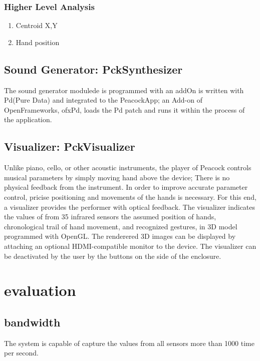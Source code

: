 \documentclass{nime-alternate}
\begin{document}
\subsubsection{Higher Level Analysis}

\begin{enumerate}
       \item Centroid X,Y
       \item Hand position
\end{enumerate}

\subsection{Sound Generator: PckSynthesizer}

The sound generator modulede is programmed with an addOn 
 is written with Pd(Pure Data) and integrated to the PeacockApp; an Add-on of OpenFrameworks, ofxPd, loads the Pd patch and runs it within the process of the application.

\subsection{Visualizer: PckVisualizer}

Unlike piano, cello, or other acoustic instruments, the player of Peacock controls musical parameters by simply moving hand above the device; There is no physical feedback from the instrument. In order to improve accurate parameter control, pricise positioning and movements of the hands is necessary. For this end, a visualizer provides the performer with optical feedback.  The visualizer indicates the values of from 35 infrared sensors  the assumed position of hands, chronological trail of hand movement, and recognized gestures, in  3D model programmed with OpenGL. The renderered 3D images can be displayed by attaching an optional HDMI-compatible monitor to the device.
The visualizer can be deactivated by the user by the buttons on the side of the enclosure.


\section{evaluation}

\subsection{bandwidth}
The system is capable of capture the values from all sensors more than 1000 time per second.
\end{document}
